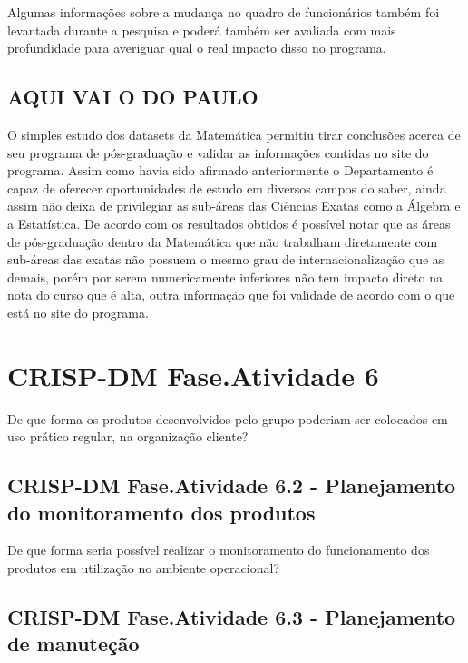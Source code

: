 \documentclass[]{article}
\begin{document}
Algumas informações sobre a mudança no quadro de funcionários também foi
levantada durante a pesquisa e poderá também ser avaliada com mais
profundidade para averiguar qual o real impacto disso no programa.

\subsection{AQUI VAI O DO PAULO}\label{aqui-vai-o-do-paulo}

O simples estudo dos datasets da Matemática permitiu tirar conclusões
acerca de seu programa de pós-graduação e validar as informações
contidas no site do programa. Assim como havia sido afirmado
anteriormente o Departamento é capaz de oferecer oportunidades de estudo
em diversos campos do saber, ainda assim não deixa de privilegiar as
sub-áreas das Ciências Exatas como a Álgebra e a Estatística. De acordo
com os resultados obtidos é possível notar que as áreas de pós-graduação
dentro da Matemática que não trabalham diretamente com sub-áreas das
exatas não possuem o mesmo grau de internacionalização que as demais,
porém por serem numericamente inferiores não tem impacto direto na nota
do curso que é alta, outra informação que foi validade de acordo com o
que está no site do programa.

\section{CRISP-DM Fase.Atividade 6}\label{crisp-dm-fase.atividade-6}

De que forma os produtos desenvolvidos pelo grupo poderiam ser colocados
em uso prático regular, na organização cliente?

\subsection{CRISP-DM Fase.Atividade 6.2 - Planejamento do monitoramento
dos
produtos}\label{crisp-dm-fase.atividade-6.2---planejamento-do-monitoramento-dos-produtos}

De que forma seria possível realizar o monitoramento do funcionamento
dos produtos em utilização no ambiente operacional?

\subsection{CRISP-DM Fase.Atividade 6.3 - Planejamento de
manuteção}\label{crisp-dm-fase.atividade-6.3---planejamento-de-manutecao}
\end{document}
